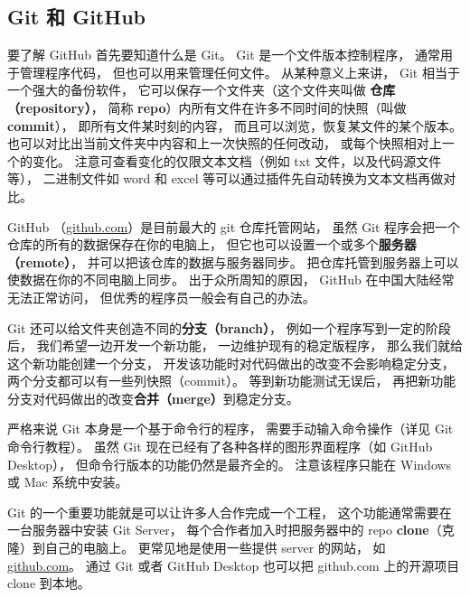 

\begin{issues}
\issueTODO
\end{issues}

\subsection{Git 和 GitHub}
要了解 GitHub 首先要知道什么是 Git。 Git 是一个文件版本控制程序， 通常用于管理程序代码， 但也可以用来管理任何文件。 从某种意义上来讲， Git 相当于一个强大的备份软件， 它可以保存一个文件夹（这个文件夹叫做 \textbf{仓库（repository）}， 简称 \textbf{repo}）内所有文件在许多不同时间的快照（叫做 \textbf{commit}）， 即所有文件某时刻的内容， 而且可以浏览，恢复某文件的某个版本。 也可以对比出当前文件夹中内容和上一次快照的任何改动， 或每个快照相对上一个的变化。 注意可查看变化的仅限文本文档（例如 txt 文件，以及代码源文件等）， 二进制文件如 word 和 excel 等可以通过插件先自动转换为文本文档再做对比。

GitHub （\href{https://github.com}{github.com}）是目前最大的 git 仓库托管网站， 虽然 Git 程序会把一个仓库的所有的数据保存在你的电脑上， 但它也可以设置一个或多个\textbf{服务器（remote）}， 并可以把该仓库的数据与服务器同步。 把仓库托管到服务器上可以使数据在你的不同电脑上同步。 出于众所周知的原因， GitHub 在中国大陆经常无法正常访问， 但优秀的程序员一般会有自己的办法。

Git 还可以给文件夹创造不同的\textbf{分支（branch）}， 例如一个程序写到一定的阶段后， 我们希望一边开发一个新功能， 一边维护现有的稳定版程序， 那么我们就给这个新功能创建一个分支， 开发该功能时对代码做出的改变不会影响稳定分支， 两个分支都可以有一些列快照（commit）。 等到新功能测试无误后， 再把新功能分支对代码做出的改变\textbf{合并（merge）}到稳定分支。

严格来说 Git 本身是一个基于命令行的程序， 需要手动输入命令操作（详见 Git 命令行教程）。 虽然 Git 现在已经有了各种各样的图形界面程序（如 GitHub Desktop）， 但命令行版本的功能仍然是最齐全的。 注意该程序只能在 Windows 或 Mac 系统中安装。

Git 的一个重要功能就是可以让许多人合作完成一个工程， 这个功能通常需要在一台服务器中安装 Git Server， 每个合作者加入时把服务器中的 repo \textbf{clone}（克隆）到自己的电脑上。 更常见地是使用一些提供 server 的网站， 如 \href{https://github.com}{github.com}。 通过 Git 或者 GitHub Desktop 也可以把 github.com 上的开源项目 clone 到本地。

